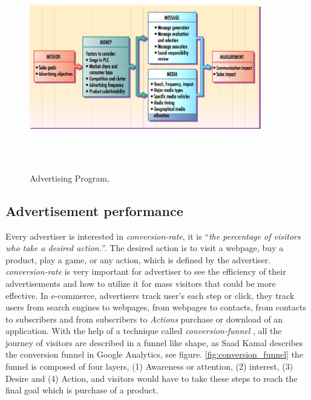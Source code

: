 \begin{figure}[H]
\centering
\includegraphics[width=0.9\textwidth,height=90mm]{Figures/2/adprogram}
\caption{Advertising Program, \cite{adprogram}}
\label{fig:adprograme}
\end{figure}




\subsection{Advertisement performance}
\label{adperformancebackground}
Every advertiser is interested in \emph{conversion-rate}, it is ``\emph{the percentage of visitors who take a desired action.}''\cite{convrate}. The desired action is to visit a webpage, buy a product, play a game, or any action, which is defined by the advertiser. \emph{conversion-rate} is very important for advertiser to see the efficiency of their advertisements and how to utilize it for mass visitors that could be more effective. In e-commerce, advertisers track user’s each step or click, they track users from search engines to webpages, from webpages to contacts, from contacts to subscribers and from subscribers to \emph{Actions} purchase or download of an application. With the help of a technique called \emph{conversion-funnel} \cite{convfunnel}, all the journey of visitors are described in a funnel like shape, as Saad Kamal \cite{googlefunnel} describes the conversion funnel in Google Analytics, see figure. \ref{fig:conversion_funnel} the funnel is composed of four layers, (1) Awareness or attention, (2) interest, (3) Desire and (4) Action, and visitors would have to take these steps to reach the final goal which is purchase of a product. 

